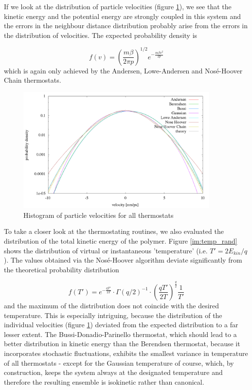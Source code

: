 If we look at the distribution of particle velocities (figure \ref{im:vel_rand}), we see that the kinetic energy and the potential energy are strongly coupled in this system and the errors in the neighbour distance distribution probably arise from the errors in the distribution of velocities. The expected probability density is

\begin{equation}
f(v) = \left(\frac{m\beta}{2\pi p}\right)^{1/2}e^{-\frac{m\beta v^2}{2p}}
\end{equation} 
which is again only achieved by the Andersen, Lowe-Andersen and Nosé-Hoover Chain thermostats. 

\begin{figure}[H]
\centering
\includegraphics[width=0.9\textwidth]{./graphics/Histogramm_velocity_rand_T=20_p=64.png}
\caption{Histogram of particle velocities for all thermostats}
\label{im:vel_rand}
\end{figure}
To take a closer look at the thermostating routines, we also evaluated the distribution of the total kinetic energy of the polymer. Figure \ref{im:temp_rand} shows the distribution of virtual or instantaneous 'temperature' (i.e. $T' = 2E_{kin}/q$). The values obtained via the Nosé-Hoover algorithm deviate significantly from the theoretical probability distribution

\begin{equation}
f(T') = e^{-\frac{qT'}{2T}}\cdot \Gamma(q/2)^{-1}\cdot \left(\frac{qT'}{2T}\right)^{\frac{q}{2}}\frac{1}{T'}  
\end{equation}
and the maximum of the distribution does not coincide with the desired temperature. This is especially intriguing, because the distribution of the individual velocities (figure \ref{im:vel_rand}) deviated from the expected distribution to a far lesser extent. 
The Bussi-Donadio-Parinello thermostat, which should lead to a better distribution in kinetic energy than the Berendsen thermostat, because it incorporates stochastic fluctuations, exhibits the smallest variance in temperature of all thermostats - except for the Gaussian temperature of course, which, by construction, keeps the system always at the designated temperature and therefore the resulting ensemble is isokinetic rather than canonical.  

